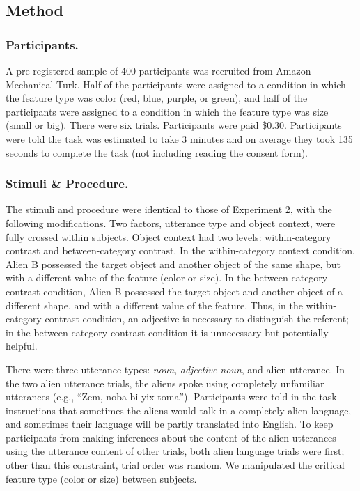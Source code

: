 \documentclass[
  english,
  man,floatsintext]{apa6}
\begin{document}
\hypertarget{method-2}{%
\subsection{Method}\label{method-2}}

\hypertarget{participants.-2}{%
\subsubsection{Participants.}\label{participants.-2}}

A pre-registered sample of 400 participants was recruited from Amazon Mechanical Turk. Half of the participants were assigned to a condition in which the feature type was color (red, blue, purple, or green), and half of the participants were assigned to a condition in which the feature type was size (small or big). There were six trials. Participants were paid \$0.30. Participants were told the task was estimated to take 3 minutes and on average they took 135 seconds to complete the task (not including reading the consent form).

\hypertarget{stimuli-procedure.-1}{%
\subsubsection{Stimuli \& Procedure.}\label{stimuli-procedure.-1}}

The stimuli and procedure were identical to those of Experiment 2, with the following modifications. Two factors, utterance type and object context, were fully crossed within subjects. Object context had two levels: within-category contrast and between-category contrast. In the within-category context condition, Alien B possessed the target object and another object of the same shape, but with a different value of the feature (color or size). In the between-category contrast condition, Alien B possessed the target object and another object of a different shape, and with a different value of the feature. Thus, in the within-category contrast condition, an adjective is necessary to distinguish the referent; in the between-category contrast condition it is unnecessary but potentially helpful.

There were three utterance types: \emph{noun}, \emph{adjective noun}, and alien utterance. In the two alien utterance trials, the aliens spoke using completely unfamiliar utterances (e.g., ``Zem, noba bi yix toma''). Participants were told in the task instructions that sometimes the aliens would talk in a completely alien language, and sometimes their language will be partly translated into English. To keep participants from making inferences about the content of the alien utterances using the utterance content of other trials, both alien language trials were first; other than this constraint, trial order was random. We manipulated the critical feature type (color or size) between subjects.
\end{document}
